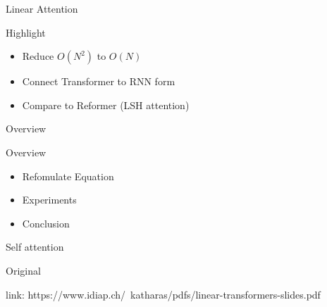 \documentclass[10pt]{beamer}
\begin{document}
\begin{frame}[t]{Linear Attention}

    \begin{figure}
        \begin{center}
        \end{center}
    \end{figure}
    \begin{center}
    \end{center}
\end{frame}

\begin{frame}{Highlight}

    \begin{itemize}
        \item Reduce $O(N^2)$ to $O(N)$ 
        \item Connect Transformer to RNN form
        \item Compare to Reformer (LSH attention)
    \end{itemize}

\end{frame}

\begin{frame}{Overview}

Overview
\begin{itemize}
    \item Refomulate Equation
    \item Experiments
    \item Conclusion
\end{itemize}

\end{frame}

\begin{frame}{Self attention}

    Original

    \begin{figure}
        \begin{center}
        \end{center}
    \end{figure}
    link: https://www.idiap.ch/~katharas/pdfs/linear-transformers-slides.pdf
\end{frame}
\end{document}
